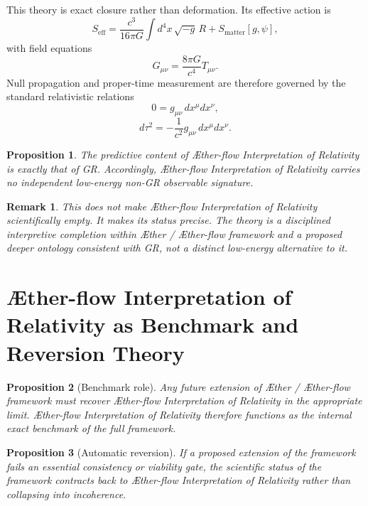 \documentclass[11pt]{article}
\newcommand{\Aether}{\AE{}ther}
\newcommand{\Aflow}{\AE{}ther-flow}
\newcommand{\TheoryName}{\Aflow{} Interpretation of Relativity}
\newcommand{\TheoryProgram}{\Aether{} / \Aflow{} framework}
\newtheorem{proposition}{Proposition}
\newtheorem{remark}{Remark}
\begin{document}
This theory is exact closure rather than deformation. Its effective action is
\begin{equation}
S_{\mathrm{eff}}
=
\frac{c^3}{16\pi G}\int d^4x\,\sqrt{-g}\,R
+
S_{\mathrm{matter}}[g,\psi],
\label{eq:SA}
\end{equation}
with field equations
\begin{equation}
G_{\mu\nu} = \frac{8\pi G}{c^4} T_{\mu\nu}.
\label{eq:einstein}
\end{equation}
Null propagation and proper-time measurement are therefore governed by the standard relativistic relations
\begin{equation}
0 = g_{\mu\nu}\,dx^{\mu}dx^{\nu},
\label{eq:null}
\end{equation}
\begin{equation}
d\tau^2 = -\frac{1}{c^2} g_{\mu\nu}\,dx^{\mu}dx^{\nu}.
\label{eq:propertime}
\end{equation}

\begin{proposition}
The predictive content of \TheoryName{} is exactly that of GR. Accordingly, \TheoryName{} carries no independent low-energy non-GR observable signature.
\end{proposition}

\begin{remark}
This does not make \TheoryName{} scientifically empty. It makes its status precise. The theory is a disciplined interpretive completion within \TheoryProgram{} and a proposed deeper ontology consistent with GR, not a distinct low-energy alternative to it.
\end{remark}

\section{\TheoryName{} as Benchmark and Reversion Theory}

\begin{proposition}[Benchmark role]
Any future extension of \TheoryProgram{} must recover \TheoryName{} in the appropriate limit. \TheoryName{} therefore functions as the internal exact benchmark of the full framework.
\end{proposition}

\begin{proposition}[Automatic reversion]
If a proposed extension of the framework fails an essential consistency or viability gate, the scientific status of the framework contracts back to \TheoryName{} rather than collapsing into incoherence.
\end{proposition}
\end{document}
